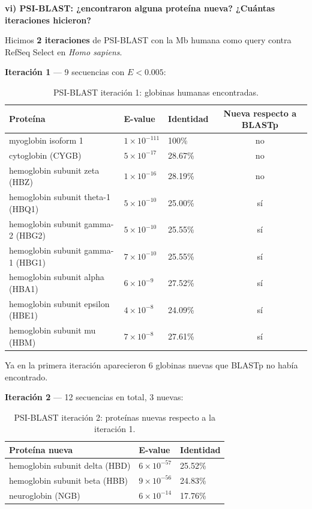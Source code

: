 \textbf{vi) PSI-BLAST: ¿encontraron alguna proteína nueva? ¿Cuántas iteraciones hicieron?}

Hicimos \textbf{2 iteraciones} de PSI-BLAST con la Mb humana como query contra RefSeq Select en
\textit{Homo sapiens}.

\medskip
\noindent\textbf{Iteración 1} --- 9 secuencias con $E < 0.005$:

\begin{table}[H]
\centering
\footnotesize
\begin{tabular}{lP{2.4cm}P{1.8cm}c}
\toprule
Proteína & E-value & Identidad & Nueva respecto a BLASTp \\
\midrule
myoglobin isoform 1              & $1 \times 10^{-111}$ & 100\%   & no \\
cytoglobin (CYGB)                & $5 \times 10^{-17}$  & 28.67\% & no \\
hemoglobin subunit zeta (HBZ)    & $1 \times 10^{-16}$  & 28.19\% & no \\
hemoglobin subunit theta-1 (HBQ1)& $5 \times 10^{-10}$  & 25.00\% & sí \\
hemoglobin subunit gamma-2 (HBG2)& $5 \times 10^{-10}$  & 25.55\% & sí \\
hemoglobin subunit gamma-1 (HBG1)& $7 \times 10^{-10}$  & 25.55\% & sí \\
hemoglobin subunit alpha (HBA1)  & $6 \times 10^{-9}$   & 27.52\% & sí \\
hemoglobin subunit epsilon (HBE1)& $4 \times 10^{-8}$   & 24.09\% & sí \\
hemoglobin subunit mu (HBM)      & $7 \times 10^{-8}$   & 27.61\% & sí \\
\bottomrule
\end{tabular}
\caption{PSI-BLAST iteración 1: globinas humanas encontradas.}
\end{table}

Ya en la primera iteración aparecieron 6 globinas nuevas que BLASTp no había encontrado.

\medskip
\noindent\textbf{Iteración 2} --- 12 secuencias en total, 3 nuevas:

\begin{table}[H]
\centering
\footnotesize
\begin{tabular}{lP{2.4cm}P{1.8cm}}
\toprule
Proteína nueva & E-value & Identidad \\
\midrule
hemoglobin subunit delta (HBD) & $6 \times 10^{-57}$ & 25.52\% \\
hemoglobin subunit beta (HBB)  & $9 \times 10^{-56}$ & 24.83\% \\
neuroglobin (NGB)              & $6 \times 10^{-14}$ & 17.76\% \\
\bottomrule
\end{tabular}
\caption{PSI-BLAST iteración 2: proteínas nuevas respecto a la iteración 1.}
\end{table}

